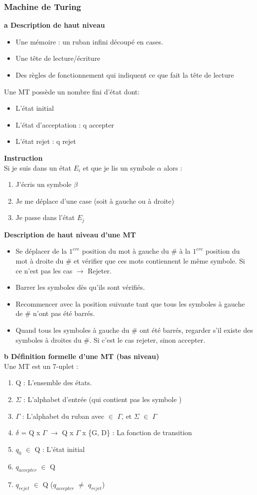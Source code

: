 \documentclass[12pt,a4paper]{article}
\begin{document}
\subsubsection{Machine de Turing}
\textbf{a Description de haut niveau}
\begin{itemize}
	\item Une mémoire : un ruban infini découpé en cases.
	\item Une tête de lecture/écriture
	\item Des règles de fonctionnement qui indiquent ce que fait la tête de lecture
\end{itemize}
Une MT possède un nombre fini d'état dont:
\begin{itemize}
	\item L'état initial
	\item L'état d'acceptation : q accepter
	\item L'état rejet : q rejet
\end{itemize}
\textbf{Instruction}\\
Si je suis dans un état $E_i$ et que je lis un symbole $\alpha$ alors :
\begin{enumerate}
	\item J'écris un symbole $\beta$
	\item Je me déplace d'une case (soit à gauche ou à droite)
	\item Je passe dans l'état $E_j$
\end{enumerate}
\textbf{Description de haut niveau d'une MT}
\begin{itemize}
	\item Se déplacer de la $1^{ere}$ position du mot à gauche du \# à la $1^{ere}$ position du mot à droite du \# et vérifier que ces mots contiennent le même symbole. Si ce n'est pas les cas $\rightarrow$ Rejeter.
	\item Barrer les symboles dès qu'ils sont vérifiés.
	\item Recommencer avec la position suivante tant que tous les symboles à gauche de \# n'ont pas été barrés.
	\item Quand tous les symboles à gauche du \# ont été barrés, regarder s'il existe des symboles à droites du \#. Si c'est le cas rejeter, sinon accepter.\\
\end{itemize}
\textbf{b Définition formelle d'une MT (bas niveau)\\}
Une MT est un 7-uplet :
\begin{enumerate}
	\item Q : L'ensemble des états.
	\item $\Sigma$ : L'alphabet d'entrée (qui contient pas les symbole \textvisiblespace)
	\item $\Gamma$ : L'alphabet du ruban avec \textvisiblespace $\in$  $\Gamma$, et $\Sigma$ $\in$ $\Gamma$
	\item $\delta$ = Q x $\Gamma$ $\rightarrow$ Q x $\Gamma$ x \{G, D\} : La fonction de transition
	\item $q_0$ $\in$ Q : L'état initial
	\item $q_{accepter}$ $\in$ Q
	\item $q_{rejet}$ $\in$ Q ($q_{accepter}$ $\neq$ $q_{rejet}$)
\end{enumerate}
\end{document}
